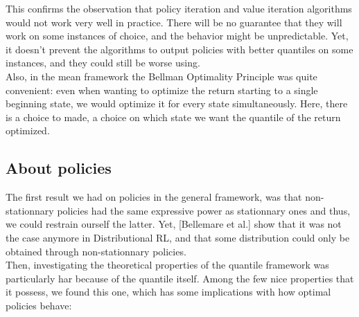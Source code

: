 This confirms the observation that policy iteration and value iteration algorithms would not work very well in practice. There will be no guarantee that they will work on some instances of choice, and the behavior might be unpredictable. Yet, it doesn’t prevent the algorithms to output policies with better quantiles on some instances, and they could still be worse using.\\

Also, in the mean framework the Bellman Optimality Principle was quite convenient: even when wanting to optimize the return starting to a single beginning state, we would optimize it for every state simultaneously. Here, there is a choice to made, a choice on which state we want the quantile of the return optimized.


\subsection{About policies}
The first result we had on policies in the general framework, was that non-stationnary policies had the same expressive power as stationnary ones and thus, we could restrain ourself the latter. Yet, [Bellemare et al.] show that it was not the case anymore in Distributional RL, and that some distribution could only be obtained through non-stationnary policies.\\

Then, investigating the theoretical properties of the quantile framework was particularly har  because of the quantile itself. Among the few nice properties that it possess, we found this one, which has some implications with how optimal policies behave:

